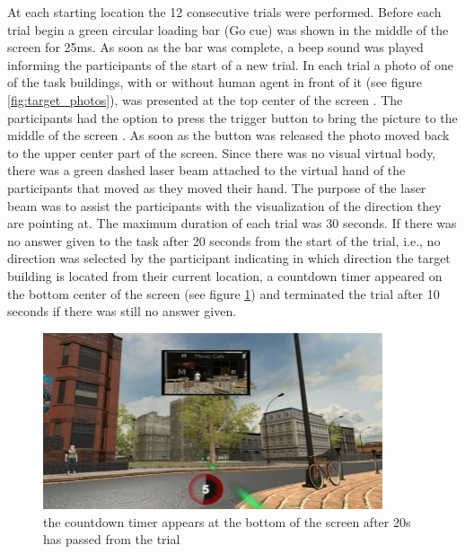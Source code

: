 At each starting location the 12 consecutive trials were performed. Before each trial begin a green circular loading bar {\emphasize (Go cue)} was shown in the middle of the screen for 25ms. As soon as the bar was complete, a beep sound was played informing the participants of the start of a new trial. In each trial a photo of one of the task buildings, with or without human agent in front of it (see figure \ref{fig:target_photos}), was presented at the top center of the screen . The participants had the option to press the trigger button to bring the picture to the middle of the screen . As soon as the button was released the photo moved back to the upper center part of the screen. Since there was no visual virtual body, there was a green dashed laser beam  attached to the virtual hand of the participants that moved as they moved their hand. The purpose of the laser beam was to assist the participants with the visualization of the direction they are pointing at. The maximum duration of each trial was 30 seconds. If there was no answer given to the task after 20 seconds from the start of the trial, i.e., no direction was selected by the participant indicating in which direction the target building is located from their current location, a countdown timer appeared on the bottom center of the screen (see figure \ref{fig:timer}) and terminated the trial after 10 seconds if there was still no answer given. \\

\begin{figure}[h]
	\centering
	\includegraphics[width=100mm]{figures/timer.jpg}
	\caption[The countdown timer]{the countdown timer appears at the bottom of the screen after 20s has passed from the trial}
	\label{fig:timer}
\end{figure}

